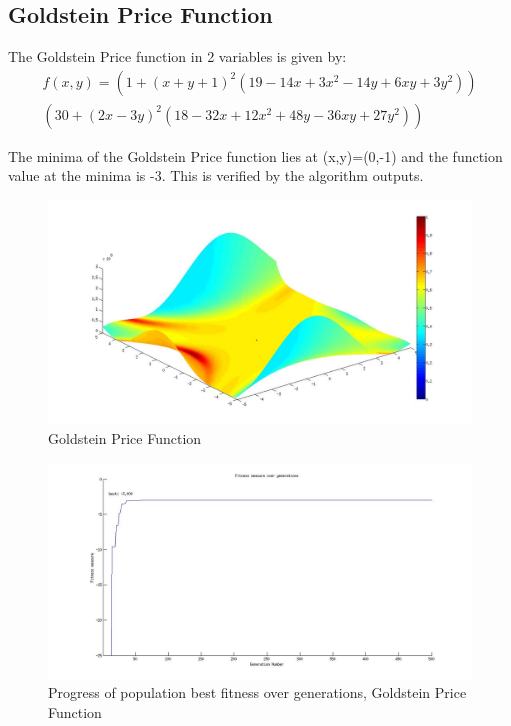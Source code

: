 \documentclass[a4paper]{article}
\begin{document}
\subsection{Goldstein Price Function}

The Goldstein Price function in 2 variables is given by:
\begin{multline}
f(x,y)=(1+(x+y+1)^2(19-14x+3x^2-14y+6xy+3y^2))\\
	(30+(2x-3y)^2(18-32x+12x^2+48y-36xy+27y^2))
\end{multline}

The minima of the Goldstein Price function lies at (x,y)=(0,-1) and the function value at the minima is -3. This is verified by the algorithm outputs.

\begin{figure}[hb!]
\centering
\includegraphics[width=\textwidth]{GPR.jpg}
\caption{Goldstein Price Function}
\label{GPR}
\end{figure}

\begin{figure}[hb!]
\centering
\includegraphics[width=\textwidth]{GPR_fitness_vs_generation.jpg}
\caption{Progress of population best fitness over generations, Goldstein Price Function}
\label{GPRF}
\end{figure}
\end{document}
